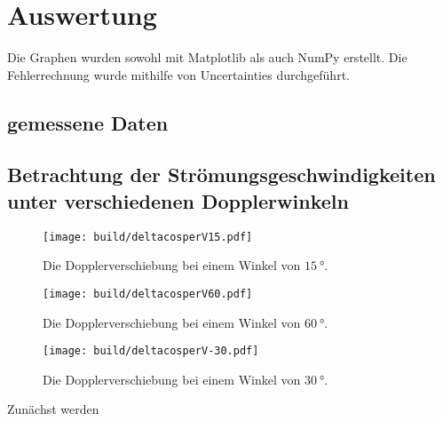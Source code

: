 \section{Auswertung}
\label{sec:Auswertung}


Die Graphen wurden sowohl mit Matplotlib \cite{matplotlib} als auch NumPy \cite{numpy} erstellt. Die
Fehlerrechnung wurde mithilfe von Uncertainties \cite{uncertainties} durchgeführt.

\subsection{gemessene Daten}

\subsection{Betrachtung der Strömungsgeschwindigkeiten unter verschiedenen Dopplerwinkeln}


\begin{figure}
 \centering
 \caption{Die Dopplerverschiebung bei einem Winkel von $\SI{15}{\degree}$.}
 \texttt{[image: build/deltacosperV15.pdf]}
 \label{fig:Graph}
\end{figure}

\begin{figure}
 \centering
 \caption{Die Dopplerverschiebung bei einem Winkel von $\SI{60}{\degree}$.}
 \texttt{[image: build/deltacosperV60.pdf]}
 \label{fig:Graph}
\end{figure}

\begin{figure}
 \centering
 \caption{Die Dopplerverschiebung bei einem Winkel von $\SI{30}{\degree}$.}
 \texttt{[image: build/deltacosperV-30.pdf]}
 \label{fig:Graph}
\end{figure}

Zunächst werden

